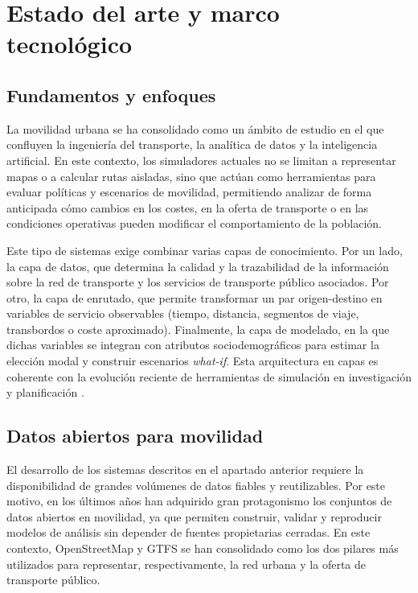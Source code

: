 \chapter{Estado del arte y marco tecnológico}

\section{Fundamentos y enfoques}

La movilidad urbana se ha consolidado como un ámbito de estudio en el que confluyen la ingeniería del transporte, la analítica de datos y la inteligencia artificial. En este contexto, los simuladores actuales no se limitan a representar mapas o a calcular rutas aisladas, sino que actúan como herramientas para evaluar políticas y escenarios de movilidad, permitiendo analizar de forma anticipada cómo cambios en los costes, en la oferta de transporte o en las condiciones operativas pueden modificar el comportamiento de la población.

Este tipo de sistemas exige combinar varias capas de conocimiento. Por un lado, la capa de datos, que determina la calidad y la trazabilidad de la información sobre la red de transporte y los servicios de transporte público asociados. Por otro, la capa de enrutado, que permite transformar un par origen-destino en variables de servicio observables (tiempo, distancia, segmentos de viaje, transbordos o coste aproximado). Finalmente, la capa de modelado, en la que dichas variables se integran con atributos sociodemográficos para estimar la elección modal y construir escenarios \textit{what-if}. Esta arquitectura en capas es coherente con la evolución reciente de herramientas de simulación en investigación y planificación \cite{Horni2016MATSim,Lopez2018SUMO}.


\section{Datos abiertos para movilidad}

El desarrollo de los sistemas descritos en el apartado anterior requiere la disponibilidad de grandes volúmenes de datos fiables y reutilizables. Por este motivo, en los últimos años han adquirido gran protagonismo los conjuntos de datos abiertos en movilidad, ya que permiten construir, validar y reproducir modelos de análisis sin depender de fuentes propietarias cerradas. En este contexto, OpenStreetMap y GTFS se han consolidado como los dos pilares más utilizados para representar, respectivamente, la red urbana y la oferta de transporte público.

